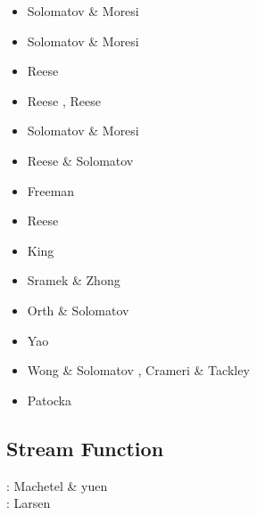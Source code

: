 \begin{scriptsize}
\begin{itemize}
\item[\nineteenninetysix] Solomatov \& Moresi \cite{somo96}
\item[\nineteenninetyseven] Solomatov \& Moresi \cite{somo97}
\item[\nineteenninetyeight] Reese \etal \cite{resm98}
\item[\nineteenninetynine] Reese \etal \cite{resm99}, Reese \etal \cite{resb99}
\item[\twothousand] Solomatov \& Moresi \cite{somo00}
\item[\twothousandtwo] Reese \& Solomatov \cite{reso02}
\item[\twothousandfour] Freeman \etal \cite{frmm04}
\item[\twothousandfive] Reese \etal \cite{resb05}
\item[\twothousandnine] King \cite{king09}
\item[\twothousandten] Sramek \& Zhong \cite{srzh10}
\item[\twothousandeleven] Orth \& Solomatov \cite{orso11}
\item[\twothousandfourteen] Yao \etal \cite{yadl14}
\item[\twothousandsixteen] Wong \& Solomatov \cite{woso16b}, Crameri \& Tackley \cite{crta16}
\item[\twothousandseventeen] Patocka \etal \cite{pact17}
\end{itemize}
\end{scriptsize}

\subsection{Stream Function} 

\begin{scriptsize}
\noindent
\nineteeneightynine: Machetel \& yuen \cite{mayu89} \\
\nineteenninetysix: Larsen \etal \cite{laym96} \\
\end{scriptsize}

